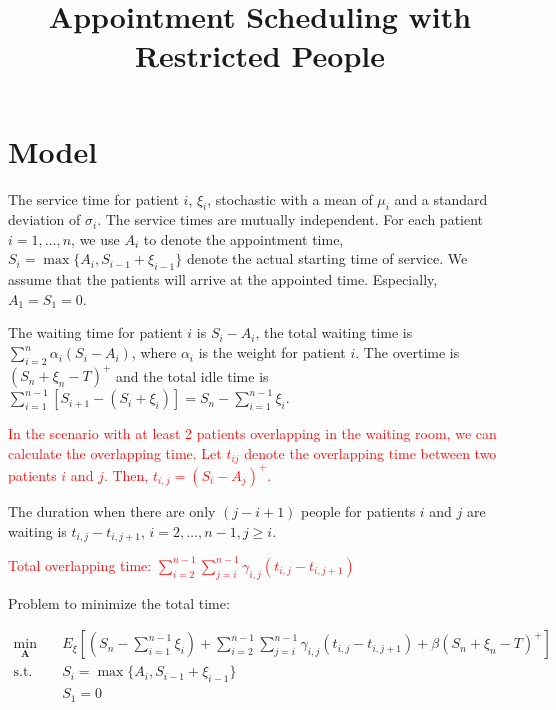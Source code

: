 \documentclass{article}
\title{Appointment Scheduling with Restricted People}
\date{}
\begin{document}
\maketitle

\section{Model}

The service time for patient $i$, $\xi_{i}$, stochastic with a mean of $\mu_{i}$ and a standard deviation of $\sigma_{i}$. The service times are mutually independent.
For each patient $i = 1, \ldots, n$, we use $A_{i}$ to denote the appointment time, $S_{i} = \max\{A_{i}, S_{i-1} + \xi_{i-1}\}$ denote the actual starting time of service. We assume that the patients will arrive at the appointed time. Especially, $A_{1} = S_{1} = 0$.

The waiting time for patient $i$ is $S_{i} - A_{i}$, the total waiting time is $\sum_{i=2}^n \alpha_i \left(S_i-A_i\right)$, where $\alpha_i$ is the weight for patient $i$. The overtime is $(S_{n} +\xi_{n} - T)^{+}$ and the total idle time is $\sum_{i=1}^{n-1}[S_{i+1} - (S_{i} + \xi_{i})] = S_{n} - \sum_{i=1}^{n-1} \xi_{i}$.


\textcolor{red}{In the scenario with at least 2 patients overlapping in the waiting room, we can calculate the overlapping time. Let $t_{ij}$ denote the overlapping time between two patients $i$ and $j$. Then, $t_{i,j} = (S_{i} - A_{j})^{+}$.}

The duration when there are only $(j-i+1)$ people for patients $i$ and $j$ are waiting is $t_{i,j} - t_{i,j+1}$, $i =2, \ldots, n-1, j \geq i$.




\textcolor{red}{Total overlapping time: $\sum_{i=2}^{n-1} \sum_{j=i}^{n-1} \gamma_{i,j} (t_{i,j} - t_{i,j+1})$}

Problem to minimize the total time:

\begin{equation}
    \begin{aligned}
        \min_{\mathbf{A}} \quad & E_{\xi}\left[\left(S_n-\sum_{i=1}^{n-1} \xi_i\right)+ \sum_{i=2}^{n-1} \sum_{j=i}^{n-1} \gamma_{i,j} (t_{i,j} - t_{i,j+1}) + \beta(S_{n} +\xi_{n} - T)^{+} \right] \\
        \mbox{s.t.} \quad & S_{i} = \max\{A_{i}, S_{i-1} + \xi_{i-1}\} \\
        & S_{1} = 0
    \end{aligned}
\end{equation}
\end{document}
